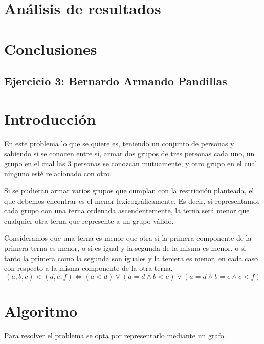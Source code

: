 \documentclass[a4paper, 12pt]{article}
\begin{document}
\section*{An\'alisis de resultados}
\section*{Conclusiones}

\begin{center}
\item \section*{Ejercicio 3: Bernardo Armando Pandillas}
\end{center}

\section*{Introducci\'on}


En este problema lo que se quiere es, teniendo un conjunto de personas y sabiendo si se conocen entre s\'i, armar dos grupos de tres personas cada uno, un grupo en el cual las 3 personas se conozcan mutuamente, y otro grupo en el cual ninguno est\'e relacionado con otro.


Si se pudieran armar varios grupos que cumplan con la restricci\'on planteada, el que debemos encontrar es el menor lexicogr\'aficamente. Es decir, si representamos cada grupo con una terna ordenada ascendentemente, la terna ser\'a menor que cualquier otra terna que represente a un grupo v\'alido.

Consideramos que una terna es menor que otra si la primera componente de la primera terna es menor, o si es igual y la segunda de la misma es menor, o si tanto la primera como la segunda son iguales y la tercera es menor, en cada caso con respecto a la misma componente de la otra terna.
\begin{displaymath}
\left(a, b, c \right) < \left( d, e, f\right) \Leftrightarrow 
\left( a < d \right) \vee \left( a = d \wedge b < e \right) \vee \left( a = d \wedge b = e \wedge c < f \right)
\end{displaymath}


\section*{Algoritmo}

Para resolver el problema se opta por representarlo mediante un grafo.
\end{document}
